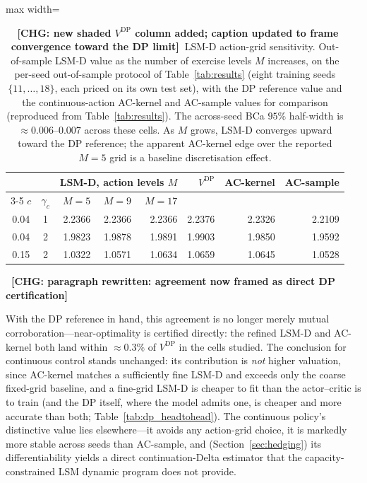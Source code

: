\documentclass[a4paper,fleqn]{cas-dc}
\newcommand{\hlc}[1]{\colorbox{chgyellow}{#1}}
\newcommand{\hlblock}[1]{\par\noindent
    \colorbox{chgyellow}{\parbox{\dimexpr\linewidth-2\fboxsep\relax}{#1}}\par}
\newcommand{\dpvhl}{\cellcolor{chgyellow}}
\newcommand{\hlc}[1]{#1}
\newcommand{\hlblock}[1]{#1}
\newcommand{\dpvhl}{}
\newcommand{\chg}[1]{{\normalfont\bfseries\color{red}~[CHG: \textsf{\footnotesize #1}]~}}
\newcommand{\chg}[1]{}
\begin{document}
\begin{table}[htbp]
    \centering
    \caption{\chg{new shaded $V^{\mathrm{DP}}$ column added; caption updated to frame convergence toward the DP limit}\hlc{LSM-D action-grid sensitivity.} Out-of-sample LSM-D value as the number of exercise levels $M$ increases, on the per-seed out-of-sample protocol of Table~\ref{tab:results} (eight training seeds $\{11,\dots,18\}$, each priced on its own test set), with the DP reference value and the continuous-action AC-kernel and AC-sample values for comparison (reproduced from Table~\ref{tab:results}). The across-seed BCa $95\%$ half-width is $\approx 0.006$--$0.007$ across these cells. As $M$ grows, LSM-D converges upward toward the DP reference; the apparent AC-kernel edge over the reported $M=5$ grid is a baseline discretisation effect.}
    \label{tab:lsm_grid}
    \begin{adjustbox}{max width=\linewidth}
        \begin{tabular}{cc rrr r rr}
            \toprule
                 &            & \multicolumn{3}{c}{LSM-D, action levels $M$} & \dpvhl $V^{\mathrm{DP}}$ & AC-kernel & AC-sample \\
            \cmidrule(lr){3-5}
            $c$  & $\gamma_c$ & $M{=}5$ & $M{=}9$ & $M{=}17$ &        &           &           \\
            \midrule
            0.04 & 1 & 2.2366 & 2.2366 & 2.2366 & \dpvhl 2.2376 & 2.2326 & 2.2109 \\
            0.04 & 2 & 1.9823 & 1.9878 & 1.9891 & \dpvhl 1.9903 & 1.9850 & 1.9592 \\
            0.15 & 2 & 1.0322 & 1.0571 & 1.0634 & \dpvhl 1.0659 & 1.0645 & 1.0528 \\
            \bottomrule
        \end{tabular}
    \end{adjustbox}
\end{table}

\chg{paragraph rewritten: agreement now framed as direct DP certification}%
\hlblock{With the DP reference in hand, this agreement is no longer merely mutual corroboration---near-optimality is certified directly: the refined LSM-D and AC-kernel both land within $\approx 0.3\%$ of $V^{\mathrm{DP}}$ in the cells studied. The conclusion for continuous control stands unchanged: its contribution is \emph{not} higher valuation, since AC-kernel matches a sufficiently fine LSM-D and exceeds only the coarse fixed-grid baseline, and a fine-grid LSM-D is cheaper to fit than the actor--critic is to train (and the DP itself, where the model admits one, is cheaper and more accurate than both; Table~\ref{tab:dp_headtohead}). The continuous policy's distinctive value lies elsewhere---it avoids any action-grid choice, it is markedly more stable across seeds than AC-sample, and (Section~\ref{sec:hedging}) its differentiability yields a direct continuation-Delta estimator that the capacity-constrained LSM dynamic program does not provide.}
\end{document}
